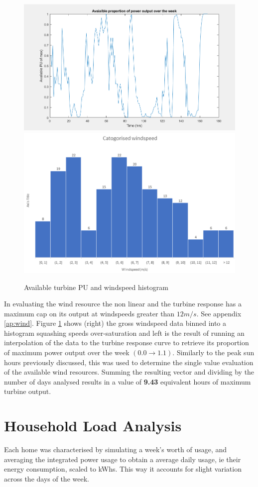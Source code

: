 \documentclass[journal]{IEEEtran}
\begin{document}
        \begin{figure}[h!]
                \centering
                \includegraphics[width=0.7\linewidth]{fig/windPU.png}
                \includegraphics[width=0.7\linewidth]{fig/catorgws.png}
                \caption{Available turbine PU and windspeed histogram}
                \label{wind}
        \end{figure}
        In evaluating the wind resource the non linear and the turbine response has a maximum cap on its output at windspeeds greater than $12m/s$. See appendix \ref{ap:wind}. Figure \ref{wind} shows (right) the gross windspeed data binned into a histogram squashing speeds over-saturation and left is the result of running an interpolation of the data to the turbine response curve to retrieve its proportion of maximum power output over the week $(0.0 \rightarrow 1.1)$. Similarly to the peak sun hours previously discussed, this was used to determine the single value evaluation of the available wind resources. Summing the resulting vector and dividing by the number of days analysed results in a value of \textbf{9.43} equivalent hours of maximum turbine output. 
        
\section{Household Load Analysis}
Each home was characterised by simulating a week’s worth of usage, and averaging the integrated power usage to obtain a average daily usage, ie their energy consumption, scaled to kWhs. This way it accounts for slight variation across the days of the week.
\end{document}

